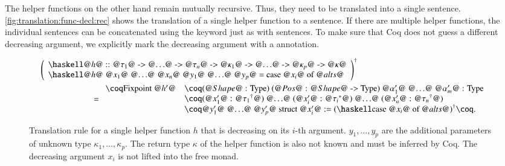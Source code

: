 The helper functions on the other hand remain mutually recursive.
Thus, they need to be translated into a single  sentence.
\autoref{fig:translation:func-decl:rec} shows the translation of a single helper function to a  sentence.
If there are multiple helper functions, the individual  sentences can be concatenated using the  keyword just as with  sentences.
To make sure that Coq does not guess a different decreasing argument, we explicitly mark the decreasing argument with a  annotation.

\begin{figure}[H]
  \begin{align*}
    &\toCoq{\left(\begin{array}{l}
      \haskellM{@$h$@ :: @$\tau_1$@ -> @$\ldots$@ -> @$\tau_n$@ -> @$\kappa_1$@ -> @$\ldots$@ -> @$\kappa_p$@ -> @$\kappa$@} \\
      \haskellM{@$h$@ @$x_1$@ @$\ldots$@ @$x_n$@ @$y_1$@ @$\ldots$@ @$y_p$@ = case @$x_i$@ of @$alts$@}
    \end{array}\right)}
    \\
    &\qquad\qquad\qquad=
    \begin{array}{ll}
      \coqM{Fixpoint @$h'$@}
        &\coqM{(@$\Shape$@ : Type) (@$\Pos$@ : @$\Shape$@ -> Type) {@$\alpha_1'$@ @$\ldots$@ @$\alpha_m'$@ : Type}} \\
        &\coqM{(@$x_1'$@ : @$\toCoqX{\tau_1}$@) @$\ldots$@ (@$x_i'$@ : @$\toCoqTX{\tau_i}$@) @$\ldots$@ (@$x_n'$@ : @$\toCoqX{\tau_n}$@)} \\
        &\coqM{@$y_1'$@ @$\ldots$@ @$y_p'$@ {struct @$x_i'$@} :=}\;\toCoq{(\haskellM{case @$x_i$@ of @$alts$@})}\coqM{.}  \\
    \end{array}
  \end{align*}
  \caption{
    Translation rule for a single helper function $h$ that is decreasing on its $i$-th argument.
    $y_1, \ldots, y_p$ are the additional parameters of unknown type $\kappa_1, \ldots, \kappa_p$.
    The return type $\kappa$ of the helper function is also not known and must be inferred by Coq.
    The decreasing argument $x_i$ is not lifted into the free monad.
  }
  \label{fig:translation:func-decl:rec}
\end{figure}

